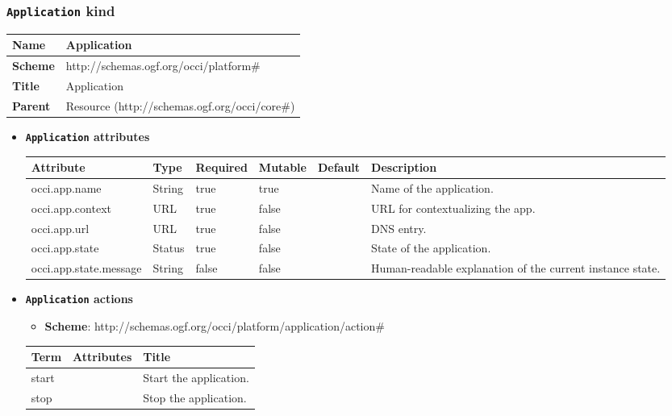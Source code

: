 \subsubsection{\texttt{Application} kind}
\begin{center}
\begin{tabular}{|l|l|}
  \hline
  \textbf{Name} & Application \\
  \hline  
  \textbf{Scheme} & http://schemas.ogf.org/occi/platform\# \\
  \hline
  \textbf{Title} & Application \\
  \hline
  \textbf{Parent} & Resource (http://schemas.ogf.org/occi/core\#) \\
  \hline
\end{tabular}
\end{center}
\begin{itemize}
\item \textbf{\texttt{Application} attributes}

\begin{tabularx}{\textwidth}{|l|l|p{1.4cm}|p{1.3cm}|l|X|}
  \hline
  \textbf{Attribute} & \textbf{Type} & \textbf{Required} & \textbf{Mutable} & \textbf{Default} & \textbf{Description} \\
  \hline  
  occi.app.name & String & true & true &  & Name of the application. \\
  \hline
  occi.app.context & URL & true & false &  & URL for contextualizing the app. \\
  \hline
  occi.app.url & URL & true & false &  & DNS entry. \\
  \hline
  occi.app.state & Status & true & false &  & State of the application. \\
  \hline
  occi.app.state.message & String & false & false &  & Human-readable explanation of the current instance state. \\
  \hline
\end{tabularx}
\end{itemize}

\begin{itemize}
\item \textbf{\texttt{Application} actions}

\begin{itemize}
	\item \textbf{Scheme}: http://schemas.ogf.org/occi/platform/application/action\#
\end{itemize}
\begin{tabularx}{\textwidth}{|l|l|X|}
  \hline
  \textbf{Term}  & \textbf{Attributes} & \textbf{Title} \\
  \hline  
  start & & Start the application. \\
  \hline
  stop & & Stop the application. \\
  \hline
\end{tabularx}
\end{itemize}

